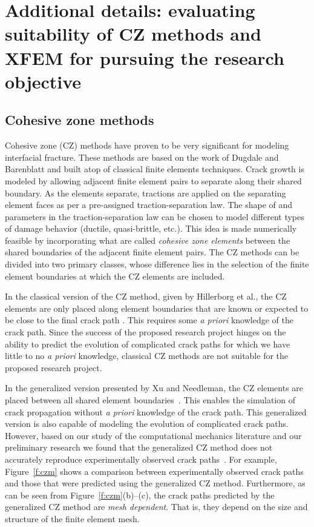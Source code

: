 \documentclass[10pt,letterpaper]{article}
\begin{document}
\section{Additional details: evaluating suitability of CZ methods and XFEM for pursuing the research objective}
  \label{s:extra}
  \subsection{Cohesive zone methods}
    \label{s:CZM}
    Cohesive zone (CZ) methods have proven to be very significant for modeling interfacial fracture. These methods are based on the work of Dugdale \cite{dugdale1960yielding} and Barenblatt \cite{barenblatt1962mathematical} and built atop of classical finite elements techniques. Crack growth is modeled by allowing adjacent finite element pairs to separate along their shared boundary. As the elements separate, tractions are applied on the separating element faces as per a pre-assigned traction-separation law. The shape of and parameters in the traction-separation law can be chosen to model different types of damage behavior (ductile, quasi-brittle, etc.). This idea is made numerically feasible by incorporating what are called \textit{cohesive zone elements} between the shared boundaries of the adjacent finite element pairs. The CZ methods can be divided into two primary classes, whose difference lies in the selection of the finite element boundaries at which the CZ elements are included.

    In the classical version of the CZ method, given by Hillerborg et al., the CZ elements are only placed along element boundaries that are known or expected to be close to the final crack path \cite{hillerborg1976analysis}. This requires some \textit{a priori} knowledge of the crack path. Since the success of the proposed research project hinges on the ability to predict the evolution of complicated crack paths for which we have little to no \textit{a priori} knowledge, classical CZ methods are not suitable for the proposed research project.

    In the generalized version presented by Xu and Needleman, the CZ elements are placed between all shared element boundaries~\cite{xu_1994,camacho1996computational}. This enables the simulation of crack propagation without \textit{a priori} knowledge of the crack path. This  generalized version is also capable of modeling the evolution of complicated crack paths. However, based on our study of the computational mechanics literature and our preliminary research we found that the  generalized CZ method does not accurately reproduce experimentally observed crack paths~\cite{tijssens2000numerical,de2003numerical,de2004computational}. For example,  Figure~\ref{f:czm} shows a comparison between  experimentally observed crack paths and those that were predicted using the generalized CZ method. Furthermore, as can be seen from Figure~\ref{f:czm}(b)--(c), the crack paths predicted by the generalized CZ method are \textit{mesh dependent}. That is, they depend on the size and structure of the finite element mesh.
\end{document}
